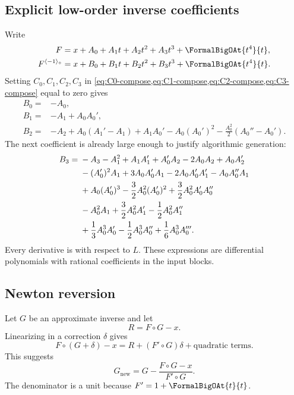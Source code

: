\documentclass[11pt]{article}
\theoremstyle{pltheorem}
\newcommand{\rev}{\langle-1\rangle_{\circ}}
\newcommand{\compose}{\mathbin{\circ}}
\begin{document}
\subsection{Explicit low-order inverse coefficients}

Write
\begin{align}
 F={}&x+A_0+A_1t+A_2t^2+A_3t^3+\FormalBigOAt{t^4}{t},\label{eq:F-inverse-low}\\
 F^{\rev}={}&x+B_0+B_1t+B_2t^2+B_3t^3+\FormalBigOAt{t^4}{t}.
 \label{eq:G-inverse-low}
\end{align}
Setting \(C_0,C_1,C_2,C_3\) in
\cref{eq:C0-compose,eq:C1-compose,eq:C2-compose,eq:C3-compose} equal to zero gives
\begin{align}
 B_0={}&-A_0,\label{eq:B0-inverse}\\
 B_1={}&-A_1+A_0A_0',\label{eq:B1-inverse}\\
 B_2={}&-A_2+A_0(A_1'-A_1)+A_1A_0'
 -A_0(A_0')^2
 -\frac{A_0^2}{2}(A_0''-A_0').
 \label{eq:B2-inverse}
\end{align}
The next coefficient is already large enough to justify algorithmic generation:
\begin{align}
 B_3={}&-A_3-A_1^2+A_1A_1'+A_0'A_2-2A_0A_2+A_0A_2'
 \notag\\
 &-(A_0')^2A_1+3A_0A_0'A_1-2A_0A_0'A_1'-A_0A_0''A_1
 \notag\\
 &+A_0(A_0')^3-\frac32A_0^2(A_0')^2
 +\frac32A_0^2A_0'A_0''
 \notag\\
 &-A_0^2A_1+\frac32A_0^2A_1'-\frac12A_0^2A_1''
 \notag\\
 &+\frac13A_0^3A_0'-\frac12A_0^3A_0''
 +\frac16A_0^3A_0'''.
 \label{eq:B3-inverse}
\end{align}
Every derivative is with respect to \(L\).  These expressions are differential polynomials with rational coefficients in the input blocks.

\subsection{Newton reversion}

Let \(G\) be an approximate inverse and let
\begin{equation}\label{eq:reversion-residual}
 R=F\compose G-x.
\end{equation}
Linearizing in a correction \(\delta\) gives
\[
 F\compose(G+\delta)-x
 =R+(F'\compose G)\delta+\text{quadratic terms}.
\]
This suggests
\begin{equation}\label{eq:newton-reversion}
 G_{\mathrm{new}}
 =G-\frac{F\compose G-x}{F'\compose G}.
\end{equation}
The denominator is a unit because \(F'=1+\FormalBigOAt{t}{t}\).
\end{document}
